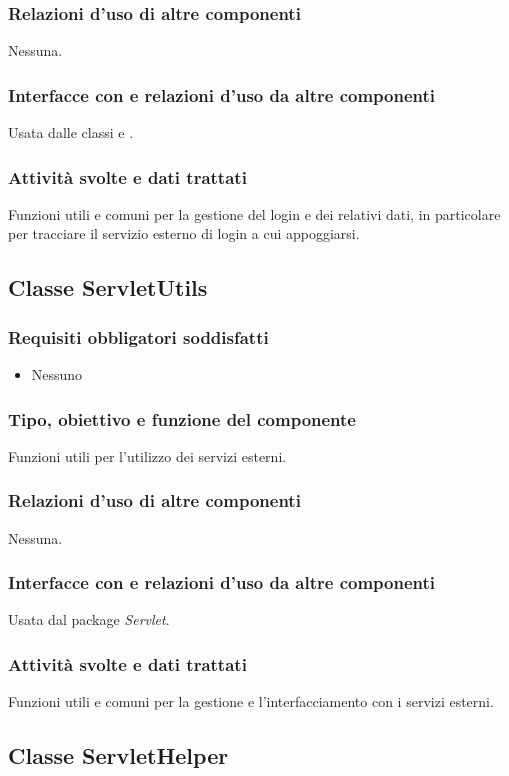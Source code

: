 \subsubsection*{Relazioni d'uso di altre componenti}
Nessuna.
\subsubsection*{Interfacce con e relazioni d'uso da altre componenti}
Usata dalle classi  e . 
\subsubsection*{Attivit\`a svolte e dati trattati}
Funzioni utili e comuni per la gestione del login e dei relativi dati, in
particolare per tracciare il servizio esterno di login a cui appoggiarsi.

\subsection{Classe ServletUtils}
\subsubsection*{Requisiti obbligatori soddisfatti}
\begin{itemize}
    \item Nessuno
\end{itemize}
\subsubsection*{Tipo, obiettivo e funzione del componente}
Funzioni utili per l'utilizzo dei servizi esterni.
\subsubsection*{Relazioni d'uso di altre componenti}
Nessuna.
\subsubsection*{Interfacce con e relazioni d'uso da altre componenti}
Usata dal package \emph{Servlet}.
\subsubsection*{Attivit\`a svolte e dati trattati}
Funzioni utili e comuni per la gestione e l'interfacciamento con i servizi
esterni.

\subsection{Classe ServletHelper}
